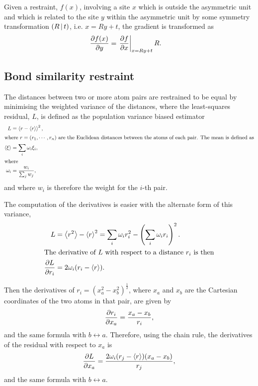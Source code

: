 \documentclass[pdf]{iucr}
\begin{document}
Given a restraint, $f(x)$, involving a site $x$ which is outside the asymmetric unit and which is related to the site $y$ within the asymmetric unit by some symmetry transformation $\left( R\,\vert\, t \right)$, i.e. $x=Ry+t$, the gradient is transformed as
\begin{align}
\frac{\partial f(x)}{\partial y}  &= \left.\frac{\partial f}{\partial x}\right|_{x=Ry+t} R.
\label{eqn:partialder:transform:under:symmetry}
\end{align}

\subsection{Bond similarity restraint}

The distances between two or more atom pairs are restrained to be equal by minimising the weighted variance of the distances, where the least-squares residual, $L$, is defined as the population variance biased estimator
\begin{align}
\label{eqn:bond_similarity}
L &= \left\langle r - \left\langle r \right\rangle \right\rangle^2,\\
\shortintertext{where $r=(r_1, \cdots, r_n)$ are the Euclidean distances between the atoms of each pair. The mean is defined as}
\left\langle \xi \right\rangle &= \sum_i \omega_i \xi_i, \\
\shortintertext{where}
\omega_i &= \frac{w_i}{\sum_j w_j},
\end{align}
and where $w_i$ is therefore the weight for the $i$-th pair.

The computation of the derivatives is easier with the alternate form of this variance, 
\begin{align}
L &= \left\langle r^2 \right\rangle - \left\langle r \right\rangle^2 = \sum_i \omega_i r_i^2 - \left(\sum_i \omega_i r_i\right)^2.\\
\shortintertext{The derivative of $L$ with respect to a distance $r_i$ is then}
\frac{\partial L}{\partial r_i} &= 2 \omega_i(r_i - \left\langle r \right\rangle).
\end{align}

Then the derivatives of $r_i = (x_a^2 - x_b^2)^\frac{1}{2}$, where $x_a$ and $x_b$ are the Cartesian coordinates of the two atoms in that pair, are given by
\begin{equation}
\frac{\partial r_i}{\partial x_a} = \frac{x_a - x_b}{r_i},
\end{equation}
and the same formula with $b \leftrightarrow a$.
Therefore, using the chain rule, the derivatives of the residual with respect to $x_a$ is
\begin{equation}
\frac{\partial L}{\partial x_a} = \frac{2 \omega_i (r_j - \left\langle r \right\rangle)(x_a - x_b)}{r_j},
\end{equation}
and the same formula with $b \leftrightarrow a$.
\end{document}
